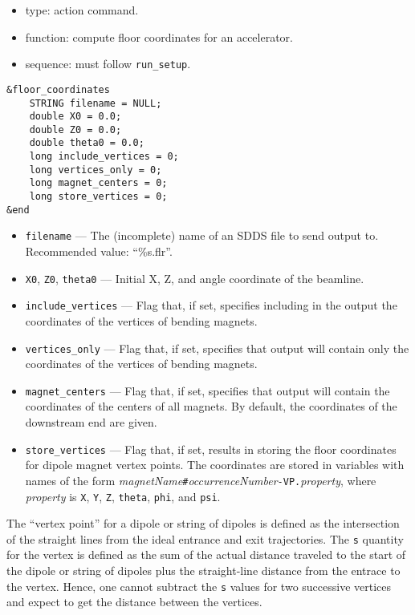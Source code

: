 \documentclass[11pt]{article}
\begin{document}
\begin{itemize}
\item type: action command.
\item function: compute floor coordinates for an accelerator.
\item sequence: must follow \verb|run_setup|.
\end{itemize}

\begin{verbatim}
&floor_coordinates
    STRING filename = NULL;
    double X0 = 0.0;
    double Z0 = 0.0;
    double theta0 = 0.0;
    long include_vertices = 0;
    long vertices_only = 0;
    long magnet_centers = 0;
    long store_vertices = 0;
&end
\end{verbatim}

\begin{itemize}
\item \verb|filename| --- The (incomplete) name of an SDDS file to send output to.  
 Recommended value: ``\%s.flr''.
\item \verb|X0|, \verb|Z0|, \verb|theta0| --- Initial X, Z, and angle coordinate of the beamline.
\item \verb|include_vertices| --- Flag that, if set, specifies including  in the output
the coordinates of the vertices of bending magnets. 
\item \verb|vertices_only| --- Flag that, if set, specifies that output will contain only
the coordinates of the vertices of bending magnets. 
\item \verb|magnet_centers| --- Flag that, if set, specifies that output will contain 
the coordinates of the centers of all magnets.  By default, the coordinates of the downstream
end are given.
\item \verb|store_vertices| --- Flag that, if set, results in storing the floor coordinates for
  dipole magnet vertex points. The coordinates are stored in variables with names of the form
  {\em magnetName}\verb|#|{\em occurrenceNumber}\verb|-VP.|{\em property}, where {\em property}
  is \verb|X|, \verb|Y|, \verb|Z|, \verb|theta|, \verb|phi|, and \verb|psi|.
\end{itemize}

The ``vertex  point'' for a dipole or string of dipoles is defined as the intersection of the
straight lines from the ideal entrance and exit trajectories. 
The \verb|s| quantity for the vertex is defined as the sum of the actual distance traveled to the
start of the dipole or string of dipoles plus the straight-line distance from the entrace to the
vertex. 
Hence, one cannot subtract the \verb|s| values for two successive vertices and expect to get the
distance between the vertices.
\end{document}
